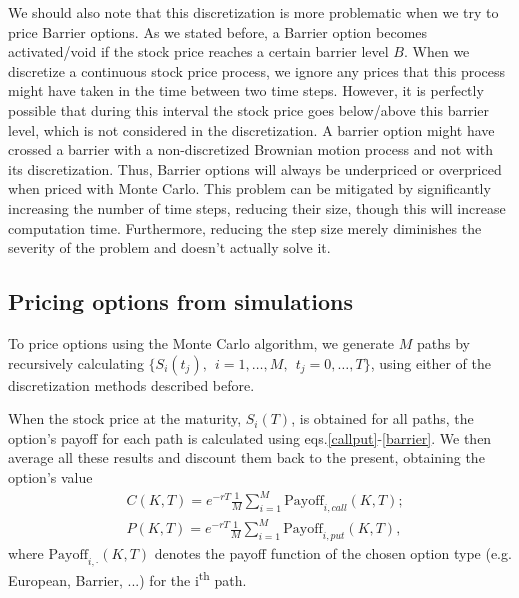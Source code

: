 We should also note that this discretization is more problematic when we try to price Barrier options. As we stated before, a Barrier option becomes activated/void if the stock price reaches a certain barrier level $B$. When we discretize a continuous stock price process, we ignore any prices that this process might have taken in the time between two time steps. However, it is perfectly possible that during this interval the stock price goes below/above this barrier level, which is not considered in the discretization. A barrier option might have crossed a barrier with a non-discretized Brownian motion process and not with its discretization. Thus, Barrier options will always be underpriced or overpriced when priced with Monte Carlo. This problem can be mitigated by significantly increasing the number of time steps, reducing their size, though this will increase computation time. Furthermore, reducing the step size merely diminishes the severity of the problem and doesn't actually solve it.


\subsection{Pricing options from simulations}
\label{subsection:Pricing options from simulations}
To price options using the Monte Carlo algorithm, we generate $M$ paths by recursively calculating $\{S_i(t_j),\ \ i=1,\ldots,M,\ \ t_j=0,\ldots,T\}$, using either of the discretization methods described before.

When the stock price at the maturity, $S_i(T)$, is obtained for all paths, the option's payoff for each path is calculated using eqs.\eqref{callput}-\eqref{barrier}. We then average all these results and discount them back to the present, obtaining the option's value
\begin{equation}\label{mcpricer}
\begin{split}
&C(K,T)=e^{-rT}\frac{1}{M}\sum_{i=1}^M\text{Payoff}_{i,call}(K,T);\\
&P(K,T)=e^{-rT}\frac{1}{M}\sum_{i=1}^M\text{Payoff}_{i,put}(K,T),
\end{split}
\end{equation}
\noindent where $\text{Payoff}_{i,\cdot}(K,T)$ denotes the payoff function of the chosen option type (e.g. European, Barrier, ...) for the i\textsuperscript{th} path.
 

